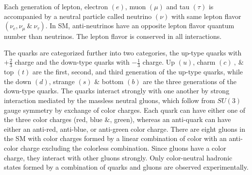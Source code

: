 Each generation of lepton, electron $(e)$, muon $(\mu)$ and tau $(\tau)$ is accompanied by a neutral particle called neutrino $(\nu)$ with same lepton flavor $(\nu_e, \nu_{\mu} ~\&~ \nu_{\tau})$. In SM, anti-neutrinos have an opposite lepton flavor quantum number than neutrinos. The lepton flavor is conserved in all interactions.

The quarks are categorized further into two categories, the up-type quarks with $+\frac{2}{3}$ charge and the down-type quarks with $-\frac{1}{3}$ charge. Up $(u)$, charm  $(c)~,~\&$ top $(t)$ are the first, second, and third generation of the up-type quarks, while the down $(d)$, strange $(s)$ $\&$ bottom $(b)$ are the three generations of the down-type quarks. The quarks interact strongly with one another by strong interaction mediated by the massless neutral gluons, which follow from $SU(3)$ gauge symmetry by exchange of color charges. Each quark can have either one of the three color charges (red, blue $\&$, green), whereas an anti-quark can have either an anti-red, anti-blue, or anti-green color charge. There are eight gluons in the SM with color charges formed by a linear combination of color with an anti-color charge excluding the colorless combination. Since gluons have a color charge, they interact with other gluons strongly. Only color-neutral hadronic states formed by a combination of quarks and gluons are observed experimentally.

